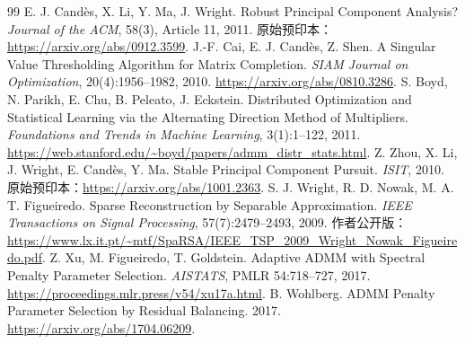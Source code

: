 \documentclass[UTF8,fontset=none,zihao=-4,a4paper]{ctexart}
\theoremstyle{plainzh}
\numberwithin{equation}{section}
\begin{document}
\begin{thebibliography}{99}
 E. J. Candès, X. Li, Y. Ma, J. Wright. Robust Principal Component Analysis? \emph{Journal of the ACM}, 58(3), Article 11, 2011. 原始预印本：\url{https://arxiv.org/abs/0912.3599}.
 J.-F. Cai, E. J. Candès, Z. Shen. A Singular Value Thresholding Algorithm for Matrix Completion. \emph{SIAM Journal on Optimization}, 20(4):1956--1982, 2010. \url{https://arxiv.org/abs/0810.3286}.
 S. Boyd, N. Parikh, E. Chu, B. Peleato, J. Eckstein. Distributed Optimization and Statistical Learning via the Alternating Direction Method of Multipliers. \emph{Foundations and Trends in Machine Learning}, 3(1):1--122, 2011. \url{https://web.stanford.edu/~boyd/papers/admm_distr_stats.html}.
 Z. Zhou, X. Li, J. Wright, E. Candès, Y. Ma. Stable Principal Component Pursuit. \emph{ISIT}, 2010. 原始预印本：\url{https://arxiv.org/abs/1001.2363}.
 S. J. Wright, R. D. Nowak, M. A. T. Figueiredo. Sparse Reconstruction by Separable Approximation. \emph{IEEE Transactions on Signal Processing}, 57(7):2479--2493, 2009. 作者公开版：\url{https://www.lx.it.pt/~mtf/SpaRSA/IEEE_TSP_2009_Wright_Nowak_Figueiredo.pdf}.
 Z. Xu, M. Figueiredo, T. Goldstein. Adaptive ADMM with Spectral Penalty Parameter Selection. \emph{AISTATS}, PMLR 54:718--727, 2017. \url{https://proceedings.mlr.press/v54/xu17a.html}.
 B. Wohlberg. ADMM Penalty Parameter Selection by Residual Balancing. 2017. \url{https://arxiv.org/abs/1704.06209}.
\end{thebibliography}
\end{document}
